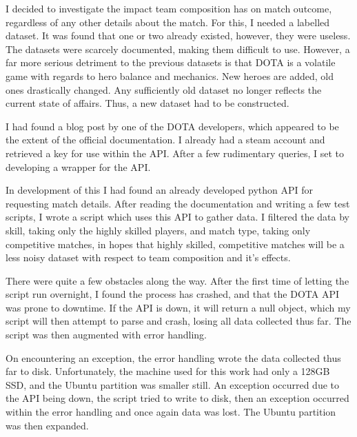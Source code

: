 \documentclass[a4paper, 12pt]{article}
\begin{document}
                 \par I decided to investigate the impact team composition has on match outcome, regardless of any other details about the match. For this, I needed a labelled dataset. It was found that one or two already existed, however, they were useless. The datasets were scarcely documented, making them difficult to use. However, a far more serious detriment to the previous datasets is that DOTA is a volatile game with regards to hero balance and mechanics. New heroes are added, old ones drastically changed. Any sufficiently old dataset no longer reflects the current state of affairs. Thus, a new dataset had to be constructed.
                 
                 \par I had found a blog post by one of the DOTA developers\cite{dotaAPI}, which appeared to be the extent of the official documentation. I already had a steam account and retrieved a key for use within the API. After a few rudimentary queries, I set to developing a wrapper for the API. 
                 
                 \par In development of this I had found an already developed python API for requesting match details\cite{pythonAPI}. After reading the documentation and writing a few test scripts, I wrote a script which uses this API to gather data. I filtered the data by skill, taking only the highly skilled players, and match type, taking only competitive matches, in hopes that highly skilled, competitive matches will be a less noisy dataset with respect to team composition and it's effects.
                 
                 \par There were quite a few obstacles along the way. After the first time of letting the script run overnight, I found the process has crashed, and that the DOTA API was prone to downtime. If the API is down, it will return a null object, which my script will then attempt to parse and crash, losing all data collected thus far. The script was then augmented with error handling.
                 
                 \par On encountering an exception, the error handling wrote the data collected thus far to disk. Unfortunately, the machine used for this work had only a 128GB SSD, and the Ubuntu partition was smaller still. An exception occurred due to the API being down, the script tried to write to disk, then an exception occurred within the error handling and once again data was lost. The Ubuntu partition was then expanded.
                 
\end{document}
